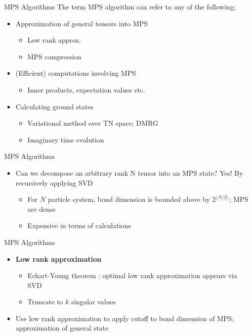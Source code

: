 \documentclass{beamer}
\begin{document}
\begin{frame}{MPS Algorithms}
	The term MPS algorithm can refer to any of the following;
		\vspace{.5cm}
		\begin{itemize}
		\item Approximation of general tensors into MPS
			\begin{itemize}
			\item Low rank approx.
			\item MPS compression
			\end{itemize}
		\item (Efficient) computations involving MPS
			\begin{itemize}
			\item Inner products, expectation values etc.
			\end{itemize}
	\item Calculating ground states
		\begin{itemize}
		\item Variational method over TN space; DMRG
		\item Imaginary time evolution
		\end{itemize}
	\end{itemize}
\end{frame}



\begin{frame}{MPS Algorithms}
	\begin{itemize}
	\item Can we decompose an arbitrary rank N tensor into an MPS state? Yes! By recursively applying SVD
		\begin{itemize}
		\item For ${ N }$ particle system, bond dimension is bounded above by ${ 2^{\lfloor N/2\rfloor}}$; MPS are dense
		\item Expensive in terms of calculations
		\end{itemize}
	\end{itemize}
\end{frame}

\begin{frame}{MPS Algorithms}
	\begin{itemize}
		\item \textbf{Low rank approximation}
			\begin{itemize}
				\item Eckart-Young theorem : optimal low rank approximation appears via SVD
				\item Truncate to ${ k }$ singular values
			\end{itemize}
		\item Use low rank approximation to apply cutoff to bond dimension of MPS; approximation of general state
	\end{itemize}
	
\end{frame}
\end{document}
